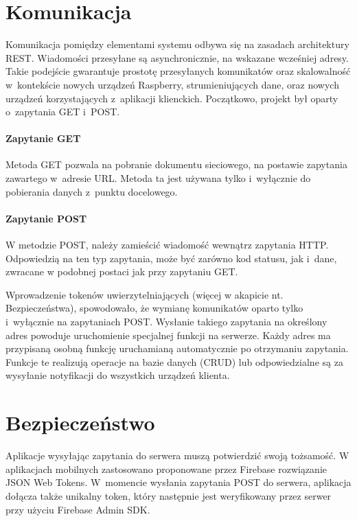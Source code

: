 \section{Komunikacja}

Komunikacja pomiędzy elementami systemu odbywa się na zasadach architektury REST. Wiadomości przesyłane są asynchronicznie, na wskazane wcześniej adresy.
Takie podejście gwarantuje prostotę przesyłanych komunikatów oraz skalowalność w~kontekście nowych urządzeń Raspberry, strumieniujących dane, oraz nowych urządzeń korzystających z~aplikacji klienckich. Początkowo, projekt był oparty o~zapytania GET i~POST.  \cite{WEBARCH}

\paragraph{Zapytanie GET}
Metoda GET pozwala na pobranie dokumentu sieciowego, na postawie zapytania zawartego w~adresie URL. Metoda ta jest używana tylko i~wyłącznie do pobierania danych z~punktu docelowego. 

\paragraph{Zapytanie POST}
W metodzie POST, należy zamieścić wiadomość wewnątrz zapytania HTTP. Odpowiedzią na ten typ zapytania, może być zarówno kod statusu, jak i~dane, zwracane w podobnej postaci jak przy zapytaniu GET.

Wprowadzenie tokenów uwierzytelniających (więcej w akapicie nt. Bezpieczeństwa), spowodowało, że wymianę komunikatów oparto tylko i~wyłącznie na zapytaniach POST. Wysłanie takiego zapytania na określony adres powoduje uruchomienie specjalnej funkcji na serwerze. Każdy adres ma przypisaną osobną funkcję uruchamianą automatycznie po otrzymaniu zapytania. Funkcje te realizują operacje na bazie danych (CRUD) lub odpowiedzialne są za wysyłanie notyfikacji do wszystkich urządzeń klienta.


\section{Bezpieczeństwo}

Aplikacje wysyłając zapytania do serwera muszą potwierdzić swoją tożsamość. 
W aplikacjach mobilnych zastosowano proponowane przez Firebase rozwiązanie JSON Web Tokens. W~momencie wysłania zapytania POST do serwera, aplikacja dołącza także unikalny token, który następnie jest weryfikowany przez serwer przy użyciu Firebase Admin SDK.

